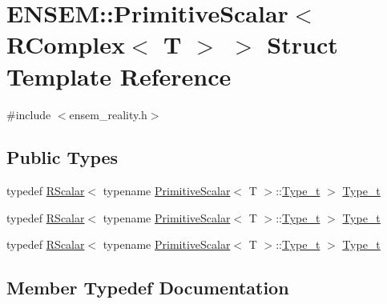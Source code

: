 \hypertarget{structENSEM_1_1PrimitiveScalar_3_01RComplex_3_01T_01_4_01_4}{}\section{E\+N\+S\+EM\+:\+:Primitive\+Scalar$<$ R\+Complex$<$ T $>$ $>$ Struct Template Reference}
\label{structENSEM_1_1PrimitiveScalar_3_01RComplex_3_01T_01_4_01_4}


{\ttfamily \#include $<$ensem\+\_\+reality.\+h$>$}

\subsection*{Public Types}
\begin{DoxyCompactItemize}
\item 
typedef \mbox{\hyperlink{classENSEM_1_1RScalar}{R\+Scalar}}$<$ typename \mbox{\hyperlink{structENSEM_1_1PrimitiveScalar}{Primitive\+Scalar}}$<$ T $>$\+::\mbox{\hyperlink{structENSEM_1_1PrimitiveScalar_3_01RComplex_3_01T_01_4_01_4_ad770c97f1555b5a3cd1a0f563d4ba782}{Type\+\_\+t}} $>$ \mbox{\hyperlink{structENSEM_1_1PrimitiveScalar_3_01RComplex_3_01T_01_4_01_4_ad770c97f1555b5a3cd1a0f563d4ba782}{Type\+\_\+t}}
\item 
typedef \mbox{\hyperlink{classENSEM_1_1RScalar}{R\+Scalar}}$<$ typename \mbox{\hyperlink{structENSEM_1_1PrimitiveScalar}{Primitive\+Scalar}}$<$ T $>$\+::\mbox{\hyperlink{structENSEM_1_1PrimitiveScalar_3_01RComplex_3_01T_01_4_01_4_ad770c97f1555b5a3cd1a0f563d4ba782}{Type\+\_\+t}} $>$ \mbox{\hyperlink{structENSEM_1_1PrimitiveScalar_3_01RComplex_3_01T_01_4_01_4_ad770c97f1555b5a3cd1a0f563d4ba782}{Type\+\_\+t}}
\item 
typedef \mbox{\hyperlink{classENSEM_1_1RScalar}{R\+Scalar}}$<$ typename \mbox{\hyperlink{structENSEM_1_1PrimitiveScalar}{Primitive\+Scalar}}$<$ T $>$\+::\mbox{\hyperlink{structENSEM_1_1PrimitiveScalar_3_01RComplex_3_01T_01_4_01_4_ad770c97f1555b5a3cd1a0f563d4ba782}{Type\+\_\+t}} $>$ \mbox{\hyperlink{structENSEM_1_1PrimitiveScalar_3_01RComplex_3_01T_01_4_01_4_ad770c97f1555b5a3cd1a0f563d4ba782}{Type\+\_\+t}}
\end{DoxyCompactItemize}


\subsection{Member Typedef Documentation}
\mbox{\label{structENSEM_1_1PrimitiveScalar_3_01RComplex_3_01T_01_4_01_4_ad770c97f1555b5a3cd1a0f563d4ba782}} 
